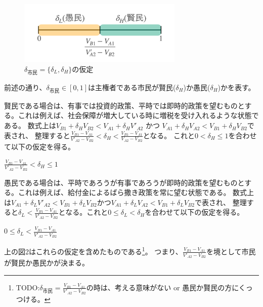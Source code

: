 \documentclass[main.tex]{subfiles}
\begin{document}
\begin{figure}[htbp]
  \centering
  \includegraphics[width=0.7\textwidth]{./image/assumption_citizen_discount_rate.png}
  \caption{$\delta_{市民}=\lbrace \delta_L, \delta_H \rbrace$の仮定} 
  \label{fig:assumption_welfare_policy}
\end{figure}


前述の通り、$\delta_{市民}\in[0,1]$は主権者である市民が賢民($\delta_H$)か愚民($\delta_H$)かを表す。

賢民である場合は、有事では投資的政策、平時では即時的政策を望むものとする。これは例えば、社会保障が増大している時に増税を受け入れるような状態である。
数式上は$V_{B1} + \delta_H V_{B2} < V_{A1} + \delta_H V'_{A2}$ かつ $V_{A1} + \delta_H V_{A2} < V_{B1} + \delta_H V_{B2}$で表され、
整理すると$\frac{V_{B1} - V_{A1}}{V'_{A2} - V_{B2}} < \delta_H < \frac{V_{B1} - V_{A1}}{V_{A2} - V_{B2}}$となる。
これと$0 < \delta_H \le 1$を合わせて以下の仮定を得る。
\begin{assumption}  $\frac{V_{B1} - V_{A1}}{V'_{A2} - V_{B2}} < \delta_H \le 1$  \end{assumption}


愚民である場合は、平時であろうが有事であろうが即時的政策を望むものとする。これは例えば、給付金によるばら撒き政策を常に望む状態である。
数式上は$V_{A1} + \delta_L V'_{A2} < V_{B1} + \delta_L V_{B2}$かつ$V_{A1} + \delta_L V_{A2} < V_{B1} + \delta_L V_{B2}$で表され、
整理すると$ \delta_L < \frac{V_{B1} - V_{A1}}{V'_{A2} - V_{B2}} $となる。これと$0\le \delta_L < \delta_H$を合わせて以下の仮定を得る。
\begin{assumption}  $0 \le  \delta_L < \frac{V_{B1} - V_{A1}}{V'_{A2} - V_{B2}} $  \end{assumption}

上の図2はこれらの仮定を含めたものである\footnote{TODO:$\delta_{市民} = \frac{V_{B1} - V_{A1}}{V'_{A2} - V_{B2}}$の時は、考える意味がない or 愚民か賢民の方にくっつける。}。
つまり、$\frac{V_{B1} - V_{A1}}{V'_{A2} - V_{B2}}$を境として市民が賢民か愚民かが決まる。 






\theendnotes
\end{document}
